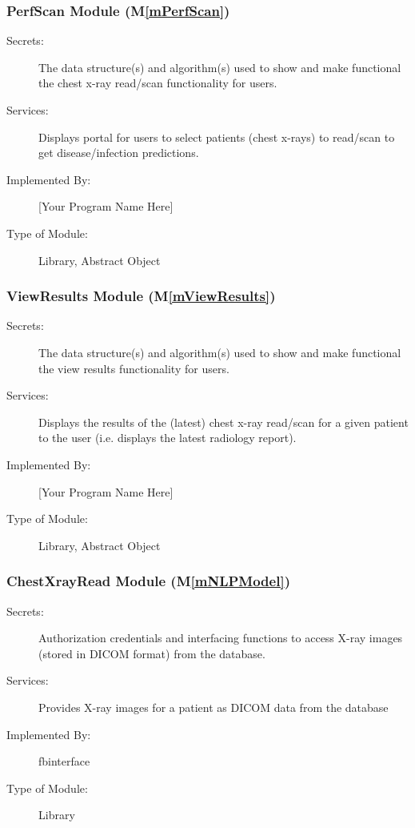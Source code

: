 \documentclass[12pt, titlepage]{article}
\newcommand{\mref}[1]{M\ref{#1}}
\begin{document}
\subsubsection{PerfScan Module (\mref{mPerfScan})}

\begin{description}
\item[Secrets:] The data structure(s) and algorithm(s) used to show and make
  functional the chest x-ray read/scan functionality for users.
\item[Services:] Displays portal for users to select patients (chest x-rays) to
  read/scan to get disease/infection predictions.
\item[Implemented By:] [Your Program Name Here]
\item[Type of Module:] Library, Abstract Object
\end{description}

\subsubsection{ViewResults Module (\mref{mViewResults})}

\begin{description}
\item[Secrets:] The data structure(s) and algorithm(s) used to show and make
  functional the view results functionality for users.
\item[Services:] Displays the results of the (latest) chest x-ray read/scan
  for a given patient to the user (i.e. displays the latest radiology report).
\item[Implemented By:] [Your Program Name Here]
\item[Type of Module:] Library, Abstract Object
\end{description}

\subsubsection{ChestXrayRead Module (\mref{mNLPModel})}

\begin{description}
\item[Secrets:] Authorization credentials and interfacing functions to access X-ray images (stored in DICOM format) from the database.
\item[Services:] Provides X-ray images for a patient as DICOM data from the database
\item[Implemented By:] fbinterface
\item[Type of Module:] Library
\end{description}
\end{document}
